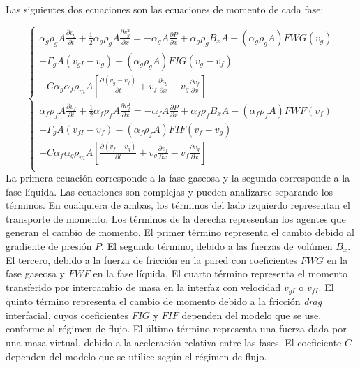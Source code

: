Las siguientes dos ecuaciones son las ecuaciones de momento de cada fase:

\begin{equation}
\left \{
\begin{array}{r}
\alpha_g \rho_g A \frac{\partial v_g}{\partial t} + \frac{1}{2} \alpha_g \rho_g A \frac{\partial v_g^2}{\partial x} = 
- \alpha_g A \frac{\partial P}{\partial x} + \alpha_g \rho_g B_x A - \left( \alpha_g \rho_g A \right) FWG \left (v_g \right) \\
+ \Gamma_g A \left( v_{gI} - v_g \right ) - \left ( \alpha_g \rho_g A \right ) FIG \left( v_g - v_f \right) \\
-C\alpha_g\alpha_f\rho_mA \left [ \frac{\partial \left( v_g - v_f \right)}{\partial t} + v_f \frac{\partial v_g}{\partial x} - v_g \frac{\partial v_f}{\partial x} \right ] \\

\alpha_f \rho_f A \frac{\partial v_f}{\partial t} + \frac{1}{2} \alpha_f \rho_f A \frac{\partial v_f^2}{\partial x} = 
- \alpha_f A \frac{\partial P}{\partial x} + \alpha_f \rho_f B_x A - \left( \alpha_f \rho_f A \right) FWF \left (v_f \right) \\
- \Gamma_g A \left( v_{fI} - v_f \right ) - \left ( \alpha_f \rho_f A \right ) FIF \left( v_f - v_g \right) \\
-C\alpha_f\alpha_g\rho_mA \left [ \frac{\partial \left( v_f - v_g \right)}{\partial t} + v_g \frac{\partial v_f}{\partial x} - v_f \frac{\partial v_g}{\partial x} \right ] \\
\end{array}
\right .
\label{relap-momento}
\end{equation}
La primera ecuación corresponde a la fase gaseosa y la segunda corresponde a la fase líquida.
Las ecuaciones son complejas y pueden analizarse separando los términos.
En cualquiera de ambas, los términos del lado izquierdo representan el transporte de momento.
Los términos de la derecha representan los agentes que generan el cambio de momento.
El primer término representa el cambio debido al gradiente de presión $P$.
El segundo término, debido a las fuerzas de volúmen $B_x$.
El tercero, debido a la fuerza de fricción en la pared con coeficientes $FWG$ en la fase gaseosa y $FWF$ en la fase líquida.
El cuarto término representa el momento transferido por intercambio de masa en la interfaz con velocidad $v_{gI}$ o $v_{fI}$.
El quinto término representa el cambio de momento debido a la fricción \textit{drag} interfacial,
cuyos coeficientes $FIG$ y $FIF$ dependen del modelo que se use, conforme al régimen de flujo.
El último término representa una fuerza dada por una masa virtual,
debido a la aceleración relativa entre las fases.
El coeficiente $C$ dependen del modelo que se utilice según el régimen de flujo.

